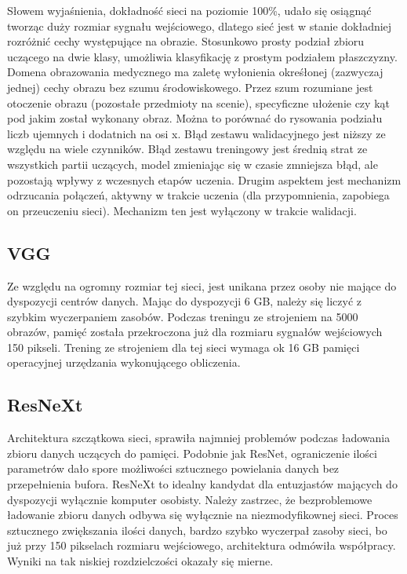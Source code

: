 \documentclass[12pt,a4paper,twoside,titlepage,openright]{book}
\begin{document}
\begin{itemize}
\begin{itemize}
Słowem wyjaśnienia, dokładność sieci na poziomie 100\%, udało się osiągnąć tworząc duży rozmiar sygnału wejściowego, dlatego sieć jest w stanie dokładniej rozróżnić cechy występujące na obrazie. Stosunkowo prosty podział zbioru uczącego na dwie klasy, umożliwia klasyfikację z prostym podziałem płaszczyzny. Domena obrazowania medycznego ma zaletę wyłonienia okreśłonej (zazwyczaj jednej) cechy obrazu bez szumu środowiskowego. Przez szum rozumiane jest otoczenie obrazu (pozostałe przedmioty na scenie), specyficzne ułożenie czy kąt pod jakim został wykonany obraz. Można to porównać do rysowania podziału liczb ujemnych i dodatnich na osi x.
Błąd zestawu walidacyjnego jest niższy ze względu na wiele czynników. Błąd zestawu treningowy jest średnią strat ze wszystkich partii uczących, model zmieniając się w czasie zmniejsza błąd, ale pozostają wpływy z wczesnych etapów uczenia. Drugim aspektem jest mechanizm odrzucania połączeń, aktywny w trakcie uczenia (dla przypomnienia, zapobiega on przeuczeniu sieci). Mechanizm ten jest wyłączony w trakcie walidacji.

\subsection{VGG}
Ze względu na ogromny rozmiar tej sieci, jest unikana przez osoby nie mające do dyspozycji centrów danych. Mając do dyspozycji 6 GB, należy się liczyć z szybkim wyczerpaniem zasobów. Podczas treningu ze strojeniem na 5000 obrazów, pamięć została przekroczona już dla rozmiaru sygnałów wejściowych 150 pikseli. Trening ze strojeniem dla tej sieci wymaga ok 16 GB pamięci operacyjnej urzędzania wykonującego obliczenia.

\subsection{ResNeXt}
Architektura szczątkowa sieci, sprawiła najmniej problemów podczas ładowania zbioru danych uczących do pamięci. Podobnie jak ResNet, ograniczenie ilości parametrów dało spore możliwości sztucznego powielania danych bez przepełnienia bufora. ResNeXt to idealny kandydat dla entuzjastów mających do dyspozycji wyłącznie komputer osobisty. Należy zastrzec, że bezproblemowe ładowanie zbioru danych odbywa się wyłącznie na niezmodyfikownej sieci. Proces sztucznego zwiększania ilości danych, bardzo szybko wyczerpał zasoby sieci, bo już przy 150 pikselach rozmiaru wejściowego, architektura odmówiła współpracy. Wyniki na tak niskiej rozdzielczości okazały się mierne.


\end{itemize}
\end{itemize}
\end{document}
